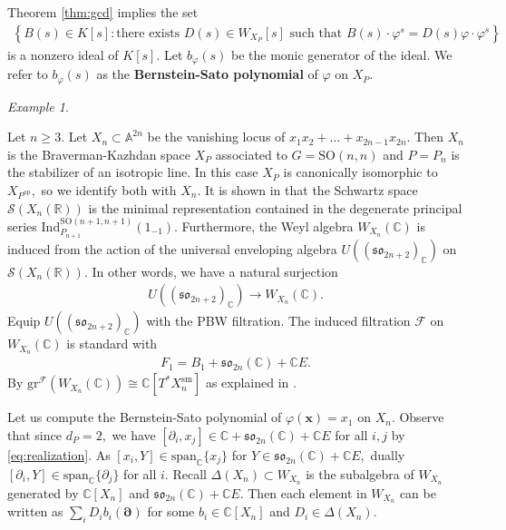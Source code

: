 \documentclass[11pt,a4paper,usenames,dvipsnames,reqno]{amsart}
\numberwithin{equation}{section}
\newcommand{\cc}{\mathbb C}
\newcommand{\rr}{\mathbb R}
\newcommand{\A}{\mathbb A}
\theoremstyle{definition}
\theoremstyle{remark}
\newtheorem{Ex}[Thm]{Example}
\begin{document}
Theorem \ref{thm:gcd} implies the set
\begin{align*}
    \left\{ B(s)\in K[s]: \textrm{there exists } D(s)\in W_{X_P}[s] \textrm{ such that } B(s)\cdot \varphi^s=D(s)\varphi\cdot \varphi^s\right\}
\end{align*}
is a nonzero ideal of $K[s].$ Let $b_\varphi(s)$ be the monic generator of the ideal. We refer to $b_\varphi(s)$ as the \textbf{Bernstein-Sato polynomial} of $\varphi$ on $X_P.$ 

\begin{Ex}\label{ex}

Let $n\ge 3.$ Let $X_n\subset \A^{2n}$ be the vanishing locus of $x_1x_2+\ldots +x_{2n-1}x_{2n}$. Then $X_n$ is the Braverman-Kazhdan space $X_P$ associated to $G=\mathrm{SO}(n,n)$ and $P=P_n$ is the stabilizer of an isotropic line. In this case $X_P$ is canonically isomorphic to $X_{P^{\mathrm{op}}},$ so we identify both with $X_n$. It is shown in \cite[Example 7.10]{Hsu:asymptotics} that the Schwartz space $\mathcal{S}(X_n(\rr))$ is the minimal representation contained in the degenerate principal series $\mathrm{Ind}_{P_{n+1}}^{\mathrm{SO}(n+1,n+1)}(1_{-1})$. Furthermore, the Weyl algebra $W_{X_n}(\cc)$ is induced from the action of the universal enveloping algebra $U((\mathfrak{so}_{2n+2})_\cc)$ on $\mathcal{S}(X_n(\rr))$. In other words, we have a natural surjection
\begin{align*}
    U((\mathfrak{so}_{2n+2})_\cc) \longrightarrow W_{X_n}(\cc).
\end{align*}
Equip $U((\mathfrak{so}_{2n+2})_\cc) $ with the PBW filtration. The induced filtration $\mathcal{F}$ on $W_{X_n}(\cc)$ is standard with 
\begin{align*}
    F_1=B_1+\mathfrak{so}_{2n}(\cc)+\cc E.
\end{align*}
By \cite{Josephideal} $\mathrm{gr}^{\mathcal{F}}(W_{X_n}(\cc))\cong \cc[T^\ast X_n^\mathrm{sm}]$  as explained in \cite[Remark 4.3]{FuLiu}.

Let us compute the Bernstein-Sato polynomial of $\varphi(\mathbf{x})=x_1$ on $X_n$. Observe that since $d_{P}=2,$ we have $[\partial_i,x_j]\in \cc+\mathfrak{so}_{2n}(\cc)+\cc E$ for all $i,j$ by \eqref{eq:realization}. As $[x_i,Y]\in \mathrm{span}_\cc\{x_j\}$ for $Y\in \mathfrak{so}_{2n}(\cc)+\cc E,$ dually $[\partial_i,Y]\in \mathrm{span}_\cc\{\partial_j\}$ for all $i$. Recall $\Delta(X_n)\subset W_{X_{n}}$ is the subalgebra of $W_{X_{n}}$ generated by $\cc[X_n]$ and $\mathfrak{so}_{2n}(\cc)+\cc E.$ Then each element in $W_{X_n}$ can be written as $ \sum_i D_ib_i(\mathbf{\partial})$ for some $b_i\in\cc [X_n]$ and $D_i\in \Delta(X_n)$. 


\end{Ex}
\end{document}
